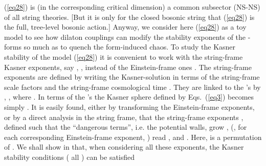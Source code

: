 \documentclass[a4paper,12pt]{article}
\begin{document}
(\ref{eq28}) is (in the corresponding critical dimension) a common 
subsector (NS-NS) of all string theories. [But it is only for the 
closed bosonic string \coordHE{} that (\ref{eq28}) is the full, 
tree-level bosonic action.] 
Anyway, we consider here (\ref{eq28}) as a 
toy model to see how dilaton couplings can modify the stability 
exponents of the \coordHE{}-forms so much as 
to quench the form-induced chaos. To study the Kasner stability of the 
model (\ref{eq28}) it is convenient to work with the string-frame 
Kasner exponents, say \coordHE{}, \coordHE{}, instead of the 
Einstein-frame ones \coordHE{}. The string-frame exponents are defined by 
writing the Kasner-solution in terms of the string-frame scale factors 
\coordHE{} and the string-frame cosmological time \coordHE{}. They are linked to the \coordHE{}'s by
\coordHE{}, 
\coordHE{},
where \coordHE{}. In terms 
of the \myHighlight{$\alpha$}\coordHE{}'s the Kasner sphere \coordHE{} defined by 
Eqs.~(\ref{eq3}) becomes simply
\coordHE{}. 
It is easily found, either by transforming the Einstein-frame exponents, 
or by a direct analysis in the string frame, 
that the string-frame exponents \coordHE{}, defined such that the 
``dangerous terms'', i.e. the potential walls, grow \coordHE{}, (\coordHE{}, for each 
corresponding Einstein-frame exponent, \coordHE{}) read
\coordHE{},
\coordHE{}
and \coordHE{}.
Here, \coordHE{} is a permutation of 
\coordHE{}. We shall show in \cite{dh2} that, when considering all 
these exponents, the Kasner stability conditions (\coordHE{} all \coordHE{}) can be satisfied 
\end{document}
